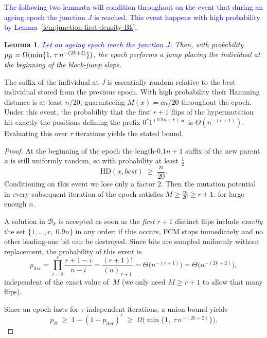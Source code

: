 \documentclass[lettersize,journal]{IEEEtran}
\newcommand{\new}[1]{\textcolor{black}{#1}}
\newtheorem{lemma}{Lemma}
\begin{document}
\textcolor{blue}{The following two lemmata will condition throughout on the event that during an ageing epoch the junction $J$ is reached.
This event happens with high probability by Lemma~\ref{lem:junction-first-density-Bk}.}

\begin{lemma} \label{lem:BJO-epoch}
	\textcolor{blue}{Let an ageing epoch reach the junction $J$.} Then, with probability $\new{p_B}=\Omega(\min\{1,\,\tau\,n^{-(2k+2)}\})$, the epoch performs a jump placing the individual at the beginning of the block-jump slope.
\end{lemma}

The suffix of the individual at $J$ is essentially random relative to the best individual stored from the 
previous epoch. 
With high probability their Hamming distance is at least $n/20$, guaranteeing 
\textcolor{black}{$M(x)= cn/20$} throughout the epoch.  
Under this event, the probability that the first $r+1$ flips of the hypermutation hit exactly the positions defining the prefix $0^{r}1^{(0.9n-r)} *$ is $\Theta(n^{-(r+1)})$.
Evaluating this over $\tau$ iterations yields the stated bound.


\begin{proof}
	At the beginning of the epoch the length-\(0.1n+1\) suffix of the new parent \(x\) is still uniformly random,
	so with probability at least \(\tfrac12\)
	\[
	\mathrm{HD}(x,best)\;\ge\;\frac{n}{20}.
	\]
	Conditioning on this event we lose only a factor \(2\).
	Then the mutation potential in every subsequent
	iteration of the epoch satisfies
	\(
	M\ge \tfrac{cn}{20}  \geq r+1.
	\) for large enough $n$.
	
A solution in $\mathcal{B}_k$ is accepted as soon as the \emph{first} $r{+}1$ distinct flips
	include \emph{exactly} the set
	\(\{1,\dots,r,\;0.9n\}\)
	in any order; if this occurs, FCM stops immediately and no other
	leading-one bit can be destroyed.
Since bits are sampled uniformly without replacement, the probability of
	this event is
	\[
	p_{\text{iter}}
	=\prod_{i=0}^{r}\frac{r+1-i}{n-i}
	=\frac{(r+1)!}{(n)_{\,r+1}}
	=\Theta\!\bigl(n^{-(r+1)}\bigr)
	=\Theta\!\bigl(n^{-(2k+2)}\bigr),
	\]
	independent of the exact value of~$M$ (we only need $M\ge r{+}1$ to allow that
	many flips).
	
Since an epoch lasts for \(\tau\) independent iterations, a union bound yields
	\[
	p_B
	\;\ge\;
	1-(1-p_{\text{iter}})^{\tau}
	\;\ge\;
	\Omega\!\bigl(\min\{1,\;\tau\,n^{-(2k+2)}\}\bigr).
	\]
	
	\noindent
\end{proof}
\end{document}
